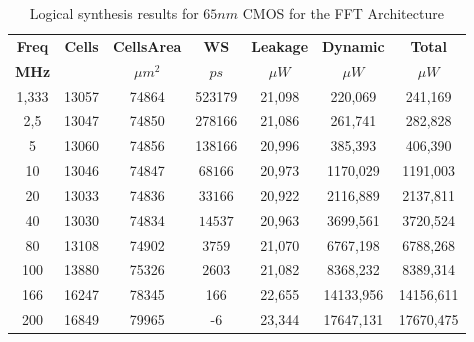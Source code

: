 \begin{table}[htb!]
\caption{Logical synthesis results for $65nm$ CMOS for the FFT Architecture}
\label{table:results_logical_synthesis_fft}
\centering
\begin{tabular}{c c c c c c c}
\toprule
\textbf{Freq} & \textbf{Cells} & \textbf{CellsArea} & \textbf{WS}  & \textbf{Leakage} 	& \textbf{Dynamic} & \textbf{Total} \\ 
\textbf{MHz}  &              & \boldmath${\mu}m^2$	& \boldmath$ps$ & \boldmath${\mu}W$ & \boldmath${\mu}W$ & \boldmath${\mu}W$ \\ \hline
1,333         & 13057          & 74864              & 523179       & 21,098        & 220,069       & 241,169     \\
2,5           & 13047          & 74850              & 278166       & 21,086        & 261,741       & 282,828     \\
5             & 13060          & 74856              & 138166       & 20,996        & 385,393       & 406,390     \\
10            & 13046          & 74847              & $68166$      & 20,973        & 1170,029       & 1191,003    \\
20            & 13033          & 74836              & $33166$      & 20,922        & 2116,889      & 2137,811    \\
40            & 13030          & 74834              & $14537$      & 20,963        & 3699,561      & 3720,524    \\
80            & 13108          & 74902              & $3759$       & 21,070        & 6767,198      & 6788,268    \\
100           & 13880          & 75326              & $2603$       & 21,082        & 8368,232      & 8389,314    \\
166           & 16247          & 78345              & 166          & 22,655        & 14133,956      & 14156,611   \\
200           & 16849          & 79965              & -6           & 23,344        & 17647,131     & 17670,475   \\ \hline
\end{tabular}
\end{table}




